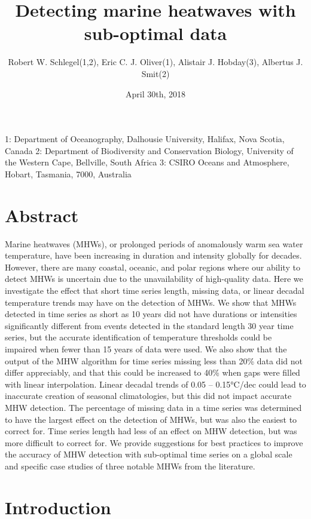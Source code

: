 \documentclass[]{article}
\title{Detecting marine heatwaves with sub-optimal data}
\author{Robert W. Schlegel(1,2), Eric C. J. Oliver(1), Alistair J. Hobday(3),
Albertus J. Smit(2)}
\date{April 30th, 2018}
\begin{document}
\maketitle

1: Department of Oceanography, Dalhousie University, Halifax, Nova
Scotia, Canada 2: Department of Biodiversity and Conservation Biology,
University of the Western Cape, Bellville, South Africa 3: CSIRO Oceans
and Atmosphere, Hobart, Tasmania, 7000, Australia

\hypertarget{abstract}{%
\section{Abstract}\label{abstract}}

Marine heatwaves (MHWs), or prolonged periods of anomalously warm sea
water temperature, have been increasing in duration and intensity
globally for decades. However, there are many coastal, oceanic, and
polar regions where our ability to detect MHWs is uncertain due to the
unavailability of high-quality data. Here we investigate the effect that
short time series length, missing data, or linear decadal temperature
trends may have on the detection of MHWs. We show that MHWs detected in
time series as short as 10 years did not have durations or intensities
significantly different from events detected in the standard length 30
year time series, but the accurate identification of temperature
thresholds could be impaired when fewer than 15 years of data were used.
We also show that the output of the MHW algorithm for time series
missing less than 20\% data did not differ appreciably, and that this
could be increased to 40\% when gaps were filled with linear
interpolation. Linear decadal trends of 0.05 -- 0.15°C/dec could lead to
inaccurate creation of seasonal climatologies, but this did not impact
accurate MHW detection. The percentage of missing data in a time series
was determined to have the largest effect on the detection of MHWs, but
was also the easiest to correct for. Time series length had less of an
effect on MHW detection, but was more difficult to correct for. We
provide suggestions for best practices to improve the accuracy of MHW
detection with sub-optimal time series on a global scale and specific
case studies of three notable MHWs from the literature.\\

\hypertarget{introduction}{%
\section{Introduction}\label{introduction}}
\end{document}
